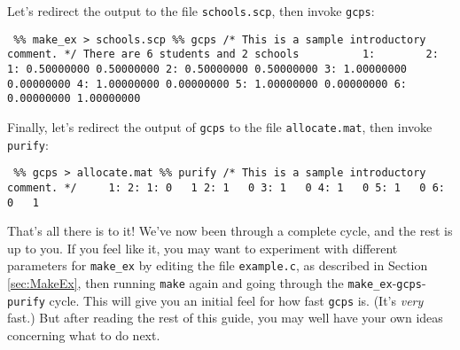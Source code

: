 \documentclass[12pt]{article}
\theoremstyle{definition}
\begin{document}
\begin{appendix}
Let's redirect the output to the file \texttt{schools.scp}, then invoke \texttt{gcps}:
\begin{obeylines}
  \texttt{
    \%\% make\_ex > schools.scp
    \%\% gcps
  /* This is a sample introductory comment. */
There are 6 students and 2 schools
\ \ \ \ \ \ \ \ \           1:   \ \ \ \ \ \ \        2:
1:   0.50000000  0.50000000
2:   0.50000000  0.50000000
3:   1.00000000  0.00000000
4:   1.00000000  0.00000000
5:   1.00000000  0.00000000
6:   0.00000000  1.00000000
  }
\end{obeylines}
\bigskip



Finally, let's redirect the output of \texttt{gcps} to the file \texttt{allocate.mat}, then invoke \texttt{purify}:
\begin{obeylines}
  \texttt{
    \%\% gcps > allocate.mat
    \%\% purify
    /* This is a sample introductory comment. */
\ \ \ \          1:   2:
   1:    0 \ \    1
   2:    1 \ \    0
   3:    1 \ \    0
   4:    1 \ \    0
   5:    1 \ \    0
   6:    0 \ \    1
  }
\end{obeylines}
\bigskip

That's all there is to it! We've now been through a complete cycle,
and the rest is up to you.  If you feel like it, you may want to
experiment with different parameters for \texttt{make\_ex} by editing
the file \texttt{example.c}, as described in Section \ref{sec:MakeEx},
then running \texttt{make} again and going through the
\texttt{make\_ex}-\texttt{gcps}- \texttt{purify} cycle.  This will
give you an initial feel for how fast \texttt{gcps} is.  (It's
\textit{very} fast.)  But after reading the rest of this guide, you
may well have your own ideas concerning what to do next.

\end{appendix}
\end{document}
